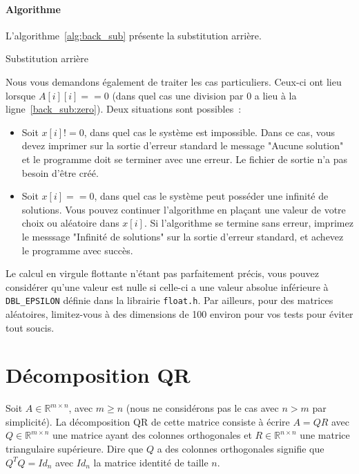 \documentclass[a4paper, 12pt]{article}
\begin{document}
\paragraph{Algorithme} L'algorithme~\ref{alg:back_sub} présente la substitution arrière.

\begin{algorithm}[!htb]
    \caption{Substitution arrière}\label{alg:back_sub}
    \begin{algorithmic}[1]
            \EndFor{}
            \label{back_sub:zero}
        \EndFor{}
    \end{algorithmic}
\end{algorithm}

Nous vous demandons également de traiter les cas particuliers. Ceux-ci ont lieu lorsque $A[i][i] == 0$ (dans quel cas une division par $0$ a lieu à la ligne~\ref{back_sub:zero}). Deux situations sont possibles~:
\begin{itemize}[leftmargin=0cm]
    \item Soit $x[i] != 0$, dans quel cas le système est impossible. Dans ce cas, vous devez imprimer sur la sortie d'erreur standard le message "Aucune solution" et le programme doit se terminer avec une erreur. Le fichier de sortie n'a pas besoin d'être créé.
    \item Soit $x[i] == 0$, dans quel cas le système peut posséder une infinité de solutions. Vous pouvez continuer l'algorithme en plaçant une valeur de votre choix ou aléatoire dans $x[i]$. Si l'algorithme se termine sans erreur, imprimez le messsage "Infinité de solutions" sur la sortie d'erreur standard, et achevez le programme avec succès.
\end{itemize}

\noindent Le calcul en virgule flottante n'étant pas parfaitement précis, vous pouvez considérer qu'une valeur est nulle si celle-ci a une valeur absolue inférieure à \texttt{DBL\_EPSILON} définie dans la librairie \texttt{float.h}. Par ailleurs, pour des matrices aléatoires, limitez-vous à des dimensions de 100 environ pour vos tests pour éviter tout soucis.

\newpage
\section{Décomposition QR}\label{app:qr}
Soit $A \in {\mathbb{R}}^{m \times n}$, avec $m \geq n$ (nous ne considérons pas le cas avec $n > m$ par simplicité). La décomposition QR de cette matrice consiste à écrire $A = QR$ avec $Q \in {\mathbb{R}}^{m \times n}$ une matrice ayant des colonnes orthogonales et $R \in {\mathbb{R}}^{n \times n}$ une matrice triangulaire supérieure. Dire que $Q$ a des colonnes orthogonales signifie que $Q^T Q = {Id}_{n}$ avec ${Id}_{n}$ la matrice identité de taille $n$.
\end{document}
